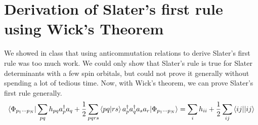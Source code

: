\documentclass{article}
\newcommand{\dg}{\ensuremath{^\dagger} }
\newcommand{\cd}{\ensuremath{\cdots} }
\begin{document}
\section{Derivation of Slater's first rule using Wick's Theorem}

We showed in class that using anticommutation relations to derive Slater's first rule was too much work. 
We could only show that Slater's rule is true for Slater determinants with a few spin orbitals, but could not prove it generally without spending a lot of tedious time. 
Now, with Wick's theorem, we can prove Slater's first rule generally. 
\[\braket{\Phi_{p_1 \cd p_N} | \sum_{pq} h_{pq} a_p^\dagger a_q  +  \frac{1}{2}  \sum_{pqrs} \braket{pq | rs} a\dg_{p}a\dg_{q} a_s a_r  | \Phi_{p_1 \cd p_N}} = \sum_i h_{ii} + \frac{1}{2}\sum_{ij} \braket{ij || ij} \]
\end{document}
